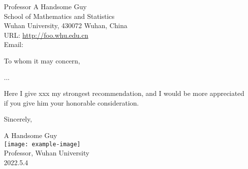 \documentclass{WHU-Recommendation-Letter}
\begin{document}
\begin{info}
  Professor A Handsome Guy \\
  School of Mathematics and Statistics \\
  Wuhan University, 430072 Wuhan, China \\
  URL: \url{http://foo.whu.edu.cn} \\
  Email:   \\
\end{info}




To whom it may concern,

...

Here I give xxx my strongest recommendation, and I would be more appreciated if you give him your honorable consideration.


Sincerely,



\begin{signature}[direction = right]
  A Handsome Guy \\
  \texttt{[image: example-image]} \\
  Professor, Wuhan University  \\
  2022.5.4
\end{signature}
\end{document}

